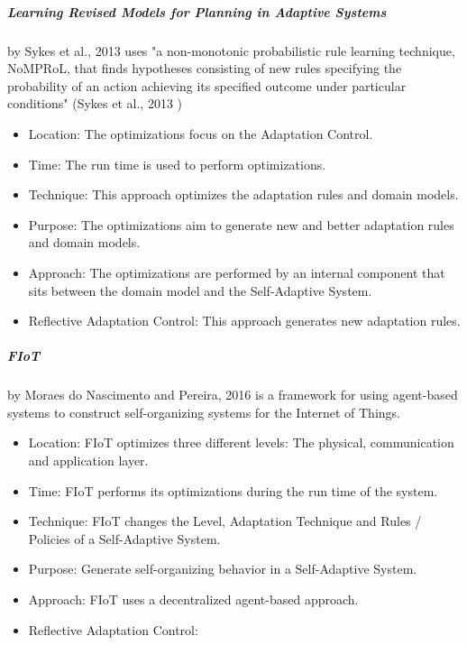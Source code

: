 \subparagraph*{Learning Revised Models for Planning in Adaptive Systems}
by Sykes et al., 2013 \cite*{LearningRevisedModels} uses
"a non-monotonic
probabilistic rule learning technique, NoMPRoL, that finds
hypotheses consisting of new rules specifying the probability
of an action achieving its specified outcome under particular
conditions" (Sykes et al., 2013 \cite*{LearningRevisedModels})
\begin{itemize}
    \item Location: The optimizations focus on the Adaptation Control.
    \item Time: The run time is used to perform optimizations.
    \item Technique: This approach optimizes the adaptation rules and domain models.
    \item Purpose: The optimizations aim to generate new and better adaptation rules and domain models.
    \item Approach: The optimizations are performed by an internal component that sits between the domain model
    and the Self-Adaptive System.
    \item Reflective Adaptation Control: This approach generates new adaptation rules.
\end{itemize}

\newpage
\subparagraph*{FIoT}
by Moraes do Nascimento and Pereira, 2016 \cite*{FIoT} is a framework for using agent-based systems
to construct self-organizing systems for the Internet of Things.
\begin{itemize}
    \item Location: FIoT optimizes three different levels: The physical, communication and application layer.
    \item Time: FIoT performs its optimizations during the run time of the system.
    \item Technique: FIoT changes the Level, Adaptation Technique and Rules / Policies of a Self-Adaptive System.
    \item Purpose: Generate self-organizing behavior in a Self-Adaptive System.
    \item Approach: FIoT uses a decentralized agent-based approach.
    \item Reflective Adaptation Control: 
\end{itemize}